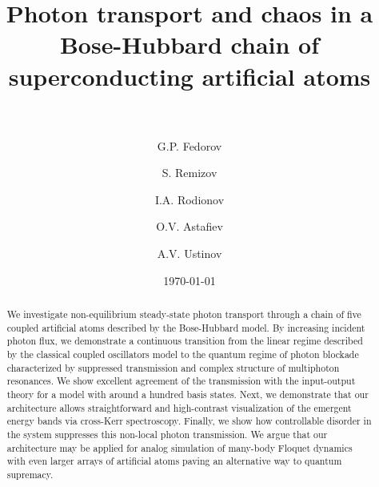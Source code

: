 \documentclass[%
 aps, pra,
 amsmath,amssymb,
 reprint,%
superscriptaddress
]{revtex4-2}
\newcommand{\mytitile}{Photon transport and chaos in a Bose-Hubbard chain of superconducting artificial atoms}
\begin{document}
	
	\title[\mytitile]{\mytitile\\~}
	\author{G.P. Fedorov}
	
	\author{S. Remizov}

	\author{I.A. Rodionov}

	\author{O.V. Astafiev}

	\author{A.V. Ustinov}
	
	
	\date{\today}%
	
	
	\begin{abstract}
We investigate non-equilibrium steady-state photon transport through a chain of five coupled artificial atoms described by the Bose-Hubbard model. By increasing incident photon flux, we demonstrate a continuous transition from the linear regime described by the classical coupled oscillators model to the quantum regime of photon blockade characterized by suppressed transmission and complex structure of multiphoton resonances. We show excellent agreement of the transmission with the input-output theory for a model with around a hundred basis states. Next, we demonstrate that our architecture allows straightforward and high-contrast visualization of the emergent energy bands via cross-Kerr spectroscopy. Finally, we show how controllable disorder in the system suppresses this non-local photon transmission. We argue that our architecture may be applied for analog simulation of many-body Floquet dynamics with even larger arrays of artificial atoms paving an alternative way to quantum supremacy.
\end{abstract}
	
\end{document}
